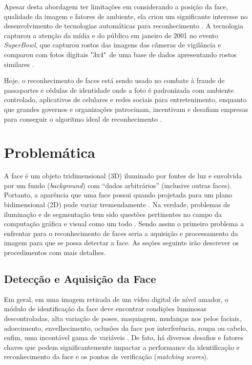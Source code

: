 Apesar desta abordagem ter limitações em considerando a posição da face, qualidade da imagem e fatores de ambiente, ela criou um significante interesse no desenvolvimento de tecnologias automáticas para reconhecimento \cite{nstc_homeland}. A tecnologia capturou a atenção da mídia e do público em janeiro de 2001 no evento \textit{SuperBowl}, que capturou rostos das imagens das câmeras de vigilância e comparou com fotos digitais "3x4"\ de uma base de dados apresentando rostos similares \cite{nstc_homeland}.

Hoje, o reconhecimento de faces está sendo usado no combate à fraude de passaportes e cédulas de identidade onde a foto é padronizada com ambiente controlado, aplicativos de celulares e redes sociais para entretenimento, enquanto que grandes governos e organizações patrocinam, incentivam e desafiam empresas para conseguir o algoritmo ideal de reconhecimento \cite{nyu_ccpr_frt}.



\section{Problemática}\label{sec:problematica}

A face é um objeto tridimensional (3D) iluminado por fontes de luz e envolvida por um fundo (\textit{background}) com “dados arbitrários” (inclusive outras faces). Portanto, a aparência que uma face possui quando projetada para um plano bidimensional (2D) pode variar tremendamente \cite{tony_columbia}. Na verdade, problemas de iluminação e de segmentação tem sido questões pertinentes no campo da computação gráfica e visual como um todo \cite{tony_columbia}. Sendo assim o primeiro problema a enfrentar para o reconhecimento de faces seria a aquisição e processamento da imagem para que se possa detectar a face. As seções seguinte irão descrever os procedimentos com mais detalhes. 


\subsection{Detecção e Aquisição da Face}\label{subsec:aquisicao_imagem}

Em geral, em uma imagem retirada de um vídeo digital de nível amador, o módulo de identificação da face deve encontrar condições luminosas descontroladas, alta variação de poses, maquiagem, mudanças nos pelos faciais, adoecimento, envelhecimento, oclusões da face por interferência, roupa ou cabelo, enfim, uma incontável gama de variáveis \cite{tony_columbia}. De fato, há diversos desafios e fatores chaves que podem significantemente impactar a performance da identificação e reconhecimento da face e os pontos de verificação (\textit{matching scores}).

